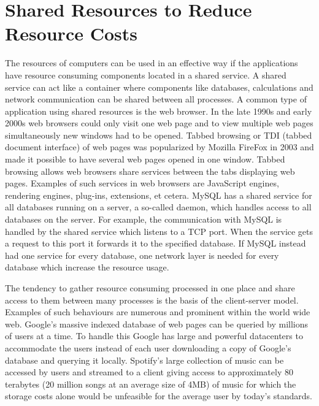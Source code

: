 \section{Shared Resources to Reduce Resource Costs}
The resources of computers can be used in an effective way if the applications have resource consuming components located in a shared service. A shared service can act like a container where components like databases, calculations and network communication can be shared between all processes. A common type of application using shared resources is the web browser. In the late 1990s and early 2000s web browsers could only visit one web page and to view multiple web pages simultaneously new windows had to be opened. Tabbed browsing or TDI (tabbed document interface) of web pages was popularized by Mozilla FireFox in 2003 and made it possible to have several web pages opened in one window. Tabbed browsing allows web browsers share services between the tabs displaying web pages. Examples of such services in web browsers are JavaScript engines, rendering engines, plug-ins, extensions, et cetera. 
MySQL has a shared service for all databases running on a server, a so-called daemon, which handles access to all databases on the server. For example, the communication with MySQL is handled by the shared service which listens to a TCP port. When the service gets a request to this port it forwards it to the specified database. If MySQL instead had one service for every database, one network layer is needed for every database which increase the resource usage. 

The tendency to gather resource consuming processed in one place and share access to them between many processes is the basis of the client-server model. Examples of such behaviours are numerous and prominent within the world wide web. Google's massive indexed database of web pages can be queried by millions of users at a time. To handle this Google has large and powerful datacenters to accommodate the users instead of each user downloading a copy of Google's database and querying it locally. Spotify's large collection of music can be accessed by users and streamed to a client giving access to approximately 80 terabytes (20 million songs at an average size of 4MB) of music for which the storage costs alone would be unfeasible for the average user by today's standards.
